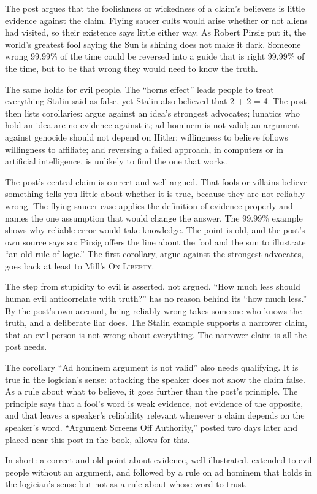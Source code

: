 \begin{afterword}
\summaryhead

The post argues that the foolishness or wickedness of a claim's believers is little evidence against the claim. Flying saucer cults would arise whether or not aliens had visited, so their existence says little either way. As Robert Pirsig put it, the world's greatest fool saying the Sun is shining does not make it dark. Someone wrong 99.99\% of the time could be reversed into a guide that is right 99.99\% of the time, but to be that wrong they would need to know the truth.

The same holds for evil people. The ``horns effect'' leads people to treat everything Stalin said as false, yet Stalin also believed that 2 + 2 = 4. The post then lists corollaries: argue against an idea's strongest advocates; lunatics who hold an idea are no evidence against it; ad hominem is not valid; an argument against genocide should not depend on Hitler; willingness to believe follows willingness to affiliate; and reversing a failed approach, in computers or in artificial intelligence, is unlikely to find the one that works.

\responsehead

The post's central claim is correct and well argued. That fools or villains believe something tells you little about whether it is true, because they are not reliably wrong. The flying saucer case applies the definition of evidence properly and names the one assumption that would change the answer. The 99.99\% example shows why reliable error would take knowledge. The point is old, and the post's own source says so: Pirsig offers the line about the fool and the sun to illustrate ``an old rule of logic.'' The first corollary, argue against the strongest advocates, goes back at least to Mill's \textsc{On Liberty}.

The step from stupidity to evil is asserted, not argued. ``How much less should human evil anticorrelate with truth?'' has no reason behind its ``how much less.'' By the post's own account, being reliably wrong takes someone who knows the truth, and a deliberate liar does. The Stalin example supports a narrower claim, that an evil person is not wrong about everything. The narrower claim is all the post needs.

The corollary ``Ad hominem argument is not valid'' also needs qualifying. It is true in the logician's sense: attacking the speaker does not show the claim false. As a rule about what to believe, it goes further than the post's principle. The principle says that a fool's word is weak evidence, not evidence of the opposite, and that leaves a speaker's reliability relevant whenever a claim depends on the speaker's word. ``Argument Screens Off Authority,'' posted two days later and placed near this post in the book, allows for this.

In short: a correct and old point about evidence, well illustrated, extended to evil people without an argument, and followed by a rule on ad hominem that holds in the logician's sense but not as a rule about whose word to trust.
\end{afterword}
